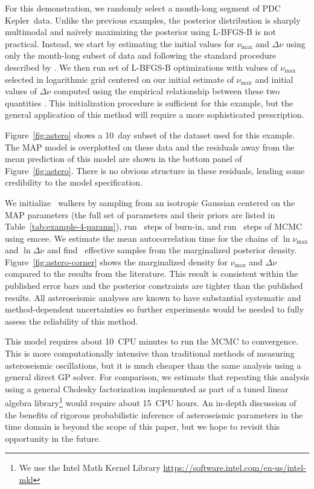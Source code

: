 \documentclass[manuscript, letterpaper]{aastex6}
\newcommand{\project}[1]{\textsf{#1}}
\newcommand{\kepler}{\project{Kepler}}
\newcommand{\emcee}{\project{emcee}}
\newcommand{\figureref}[1]{\ref{fig:#1}}
\newcommand{\Figure}[1]{Figure~\figureref{#1}}
\newcommand{\response}[1]{{\color{blue}#1}}
\begin{document}
\response{
For this demonstration, we randomly select a month-long segment of PDC
\citep{Stumpe:2012, Smith:2012} \kepler\ data.
Unlike the previous examples, the posterior distribution is sharply
multimodal and na\"ively maximizing the posterior using \project{L-BFGS-B} is
not practical.
Instead, we start by estimating the initial values for $\nu_\mathrm{max}$ and
$\Delta\nu$ using only the month-long subset of data and following the
standard procedure described by \citet{Huber:2009}.
We then run set of \project{L-BFGS-B} optimizations with values of
$\nu_\mathrm{max}$ selected in logarithmic grid centered on our initial
estimate of $\nu_\mathrm{max}$ and initial values of $\Delta\nu$ computed
using the empirical relationship between these two quantities
\citep{Stello:2009}.
This initialization procedure is sufficient for this example, but the general
application of this method will require a more sophisticated prescription.

\Figure{astero} shows a 10~day subset of the dataset used for this example.
The MAP model is overplotted on these data and the residuals away from the
mean prediction of this model are shown in the bottom panel of
\Figure{astero}.
There is no obvious structure in these residuals, lending some credibility to
the model specification.

We initialize \exampleivnwalkers~walkers by sampling from an isotropic
Gaussian centered on the MAP parameters (the full set of parameters and their
priors are listed in Table~\ref{tab:example-4-params}), run
\exampleivnburn~steps of burn-in, and run \exampleivnsteps~steps of MCMC using
\emcee.
We estimate the mean autocorrelation time for the chains of
$\ln\nu_\mathrm{max}$ and $\ln\Delta\nu$ and find \exampleivneff\ effective
samples from the marginalized posterior density.
\Figure{astero-corner} shows the marginalized density for $\nu_\mathrm{max}$
and $\Delta\nu$ compared to the results from the literature.
This result is consistent within the published error bars and the posterior
constraints are tighter than the published results.
All asteroseismic analyses are known to have substantial systematic and
method-dependent uncertainties \citep{Verner:2011} so further experiments
would be needed to fully assess the reliability of this method.

This model requires about 10~CPU minutes to run the MCMC to convergence.
This is more computationally intensive than traditional methods of measuring
asteroseismic oscillations, but it is much cheaper than the same analysis
using a general direct GP solver.
For comparison, we estimate that repeating this analysis using a general
Cholesky factorization implemented as part of a tuned linear algebra
library\footnote{We use the Intel Math Kernel Library
\url{https://software.intel.com/en-us/intel-mkl}} would require about 15~CPU
hours.
An in-depth discussion of the benefits of rigorous probabilistic inference of
asteroseismic parameters in the time domain is beyond the scope of this paper,
but we hope to revisit this opportunity in the future.
}
\end{document}
